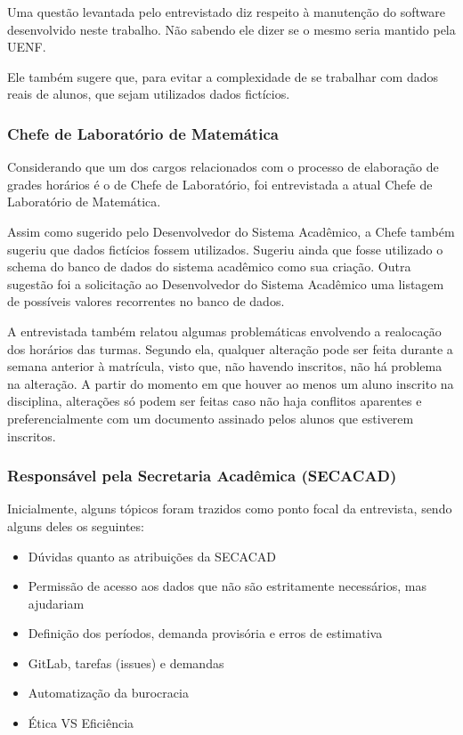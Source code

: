         Uma questão levantada pelo entrevistado diz respeito à manutenção do software desenvolvido neste trabalho. Não sabendo ele dizer se o mesmo seria mantido pela UENF.

        Ele também sugere que, para evitar a complexidade de se trabalhar com dados reais de alunos, que sejam utilizados dados fictícios.

    \subsubsection{Chefe de Laboratório de Matemática} %

        Considerando que um dos cargos relacionados com o processo de elaboração de grades horários é o de Chefe de Laboratório, foi entrevistada a atual Chefe de Laboratório de Matemática.

        Assim como sugerido pelo Desenvolvedor do Sistema Acadêmico, a Chefe também sugeriu que dados fictícios fossem utilizados. Sugeriu ainda que fosse utilizado o schema do banco de dados do sistema acadêmico como sua criação. Outra sugestão foi a solicitação ao Desenvolvedor do Sistema Acadêmico uma listagem de possíveis valores recorrentes no banco de dados.

        A entrevistada também relatou algumas problemáticas envolvendo a realocação dos horários das turmas. Segundo ela, qualquer alteração pode ser feita durante a semana anterior à matrícula, visto que, não havendo inscritos, não há problema na alteração. A partir do momento em que houver ao menos um aluno inscrito na disciplina, alterações só podem ser feitas caso não haja conflitos aparentes e preferencialmente com um documento assinado pelos alunos que estiverem inscritos.

    \subsubsection{Responsável pela Secretaria Acadêmica (SECACAD)} %

        Inicialmente, alguns tópicos foram trazidos como ponto focal da entrevista, sendo alguns deles os seguintes:

        \begin{itemize}
            \item Dúvidas quanto as atribuições da SECACAD
            \item Permissão de acesso aos dados que não são estritamente necessários, mas ajudariam
            \item Definição dos períodos, demanda provisória e erros de estimativa
            \item GitLab, tarefas (issues) e demandas
            \item Automatização da burocracia
            \item Ética VS Eficiência
        \end{itemize}


